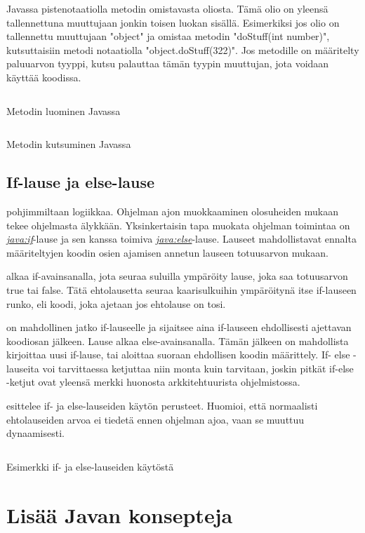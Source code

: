 \documentclass{tufte-book}
\newcommand{\java}[1]{\underline{\gls{java:#1}}}
\newcommand{\newjava}[1]{\textit{\java{#1}}}
\newcommand{\code}[3]{
\begin{listing}
    \inputminted{java}{OhjelmointiopasEsimerkit/src/#1/#2.java}
    \caption{#3}
    \label{Java-#1-#2}
\end{listing}
}
\begin{document}
 Javassa pistenotaatiolla metodin omistavasta oliosta. Tämä
olio on yleensä tallennettuna muuttujaan jonkin toisen luokan sisällä. Esimerkiksi jos olio
on tallennettu muuttujaan "object" ja omistaa metodin "doStuff(int number)", kutsuttaisiin
metodi notaatiolla "object.doStuff(322)". Jos metodille on määritelty paluuarvon tyyppi, kutsu
palauttaa tämän tyypin muuttujan, jota voidaan käyttää koodissa.

\code{week2}{BasicMethodChild}{Metodin luominen Javassa}
\code{week2}{BasicMethod}{Metodin kutsuminen Javassa}

\subsection{If-lause ja else-lause}
\label{if else}

 pohjimmiltaan logiikkaa. Ohjelman ajon muokkaaminen olosuheiden
mukaan tekee ohjelmasta älykkään. Yksinkertaisin tapa muokata ohjelman toimintaa on
\newjava{if}-lause ja sen kanssa toimiva \newjava{else}-lause. Lauseet mahdollistavat ennalta
määriteltyjen koodin osien ajamisen annetun lauseen totuusarvon mukaan.

 alkaa if-avainsanalla, jota seuraa suluilla ympäröity lause, joka saa
totuusarvon true tai false. Tätä ehtolausetta seuraa kaarisulkuihin ympäröitynä itse if-lauseen
runko, eli koodi, joka ajetaan jos ehtolause on tosi.

 on mahdollinen jatko if-lauseelle ja sijaitsee aina if-lauseen
ehdollisesti ajettavan koodiosan jälkeen. Lause alkaa else-avainsanalla. Tämän jälkeen on
mahdollista kirjoittaa uusi if-lause, tai aloittaa suoraan ehdollisen koodin määrittely. If-
else -lauseita voi tarvittaessa ketjuttaa niin monta kuin tarvitaan, joskin pitkät if-else
-ketjut ovat yleensä merkki huonosta arkkitehtuurista ohjelmistossa.

 esittelee if- ja else-lauseiden käytön perusteet. Huomioi,
että normaalisti ehtolauseiden arvoa ei tiedetä ennen ohjelman ajoa, vaan se muuttuu dynaamisesti.

\code{week2}{BasicIfElse}{Esimerkki if- ja else-lauseiden käytöstä}


\section{Lisää Javan konsepteja}
\label{ohjelman perusteista2}
\end{document}
